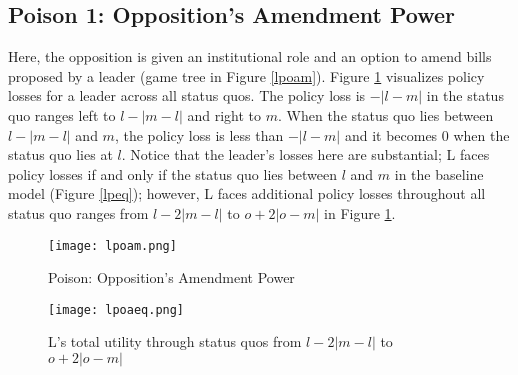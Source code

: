 \documentclass[12pt]{article}
\theoremstyle{plain}		      \newtheorem{assn}{Assumption}
\theoremstyle{plain}		      \newtheorem{prop}{Proposition}
\theoremstyle{plain}		      \newtheorem{lemma}{Lemma}
\theoremstyle{plain}	          \newtheorem{imp}{Implication}
\theoremstyle{plain}	          \newtheorem{hyp}{Hypothesis}
\theoremstyle{definition}		  \newtheorem{defn}{Definition}
\theoremstyle{remark}	          \newtheorem{rem}{Remark}
\theoremstyle{definition}         \newtheorem{case}{Case}
\begin{document}
\subsection{Poison 1: Opposition's Amendment Power}
\indent Here, the opposition is given an institutional role and an option to amend bills proposed by a leader (game tree in Figure \ref{lpoam}). Figure \ref{lpoaeq} visualizes policy losses for a leader across all status quos. The policy loss is $-|l-m|$ in the status quo ranges left to $l-|m-l|$ and right to $m$. When the status quo lies between $l-|m-l|$ and $m$, the policy loss is less than $-|l-m|$ and it becomes 0 when the status quo lies at $l$. Notice that the leader's losses here are substantial; L faces policy losses if and only if the status quo lies between $l$ and $m$ in the baseline model (Figure \ref{lpeq}); however, L faces additional policy losses throughout all status quo ranges from $l-2|m-l|$ to $o+2|o-m|$ in Figure \ref{lpoaeq}.
\begin{figure}[h]
  \centering
  \begin{minipage}[b]{0.3\textwidth}
    \texttt{[image: lpoam.png]}
    \caption{Poison: Opposition's Amendment Power}
    \label{lpoam}
  \end{minipage}
  \hfill
  \begin{minipage}[b]{0.6\textwidth}
    \texttt{[image: lpoaeq.png]}
    \caption{L's total utility through status quos \newline from $l-2|m-l|$ to $o+2|o-m|$}
    \label{lpoaeq}
  \end{minipage}
\end{figure}
\FloatBarrier
\end{document}
